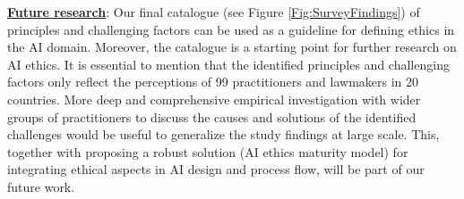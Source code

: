 \underline{\textbf{Future research}}: Our final catalogue (see Figure \ref{Fig:SurveyFindings}) of principles and challenging factors can be used as a guideline for defining ethics in the AI domain. Moreover, the catalogue is a starting point for further research on AI ethics. It is essential to mention that the identified principles and challenging factors only reflect the perceptions of 99 practitioners and lawmakers in 20 countries. More deep and comprehensive empirical investigation with wider groups of practitioners to discuss the causes and solutions of the identified challenges would be useful to generalize the study findings at large scale. This, together with proposing a robust solution (AI ethics maturity model) for integrating ethical aspects in AI design and process flow, will be part of our future work.
